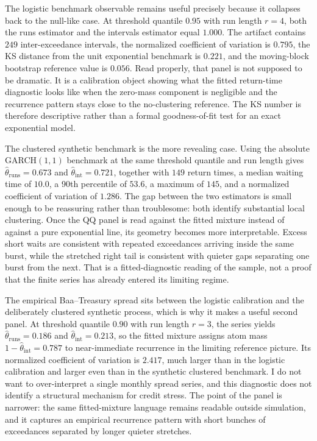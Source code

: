\documentclass[11pt]{article}
\begin{document}
The logistic benchmark observable remains useful precisely because it collapses back to the null-like case. At threshold quantile $0.95$ with run length $r=4$, both the runs estimator and the intervals estimator equal $1.000$. The artifact contains $249$ inter-exceedance intervals, the normalized coefficient of variation is $0.795$, the KS distance from the unit exponential benchmark is $0.221$, and the moving-block bootstrap reference value is $0.056$. Read properly, that panel is not supposed to be dramatic. It is a calibration object showing what the fitted return-time diagnostic looks like when the zero-mass component is negligible and the recurrence pattern stays close to the no-clustering reference. The KS number is therefore descriptive rather than a formal goodness-of-fit test for an exact exponential model.

The clustered synthetic benchmark is the more revealing case. Using the absolute GARCH$(1,1)$ benchmark at the same threshold quantile and run length gives $\widehat{\theta}_{\mathrm{runs}}=0.673$ and $\widehat{\theta}_{\mathrm{int}}=0.721$, together with $149$ return times, a median waiting time of $10.0$, a 90th percentile of $53.6$, a maximum of $145$, and a normalized coefficient of variation of $1.286$. The gap between the two estimators is small enough to be reassuring rather than troublesome: both identify substantial local clustering. Once the QQ panel is read against the fitted mixture instead of against a pure exponential line, its geometry becomes more interpretable. Excess short waits are consistent with repeated exceedances arriving inside the same burst, while the stretched right tail is consistent with quieter gaps separating one burst from the next. That is a fitted-diagnostic reading of the sample, not a proof that the finite series has already entered its limiting regime.

The empirical Baa--Treasury spread sits between the logistic calibration and the deliberately clustered synthetic process, which is why it makes a useful second panel. At threshold quantile $0.90$ with run length $r=3$, the series yields $\widehat{\theta}_{\mathrm{runs}}=0.186$ and $\widehat{\theta}_{\mathrm{int}}=0.213$, so the fitted mixture assigns atom mass $1-\widehat{\theta}_{\mathrm{int}}=0.787$ to near-immediate recurrence in the limiting reference picture. Its normalized coefficient of variation is $2.417$, much larger than in the logistic calibration and larger even than in the synthetic clustered benchmark. I do not want to over-interpret a single monthly spread series, and this diagnostic does not identify a structural mechanism for credit stress. The point of the panel is narrower: the same fitted-mixture language remains readable outside simulation, and it captures an empirical recurrence pattern with short bunches of exceedances separated by longer quieter stretches.
\end{document}
